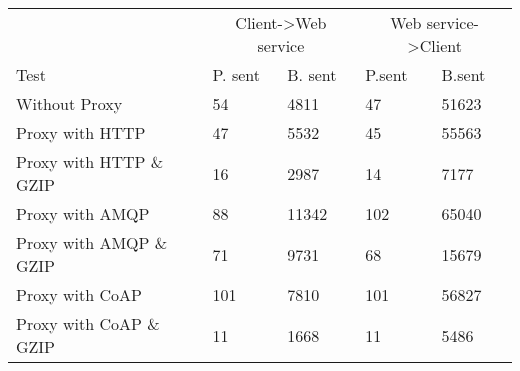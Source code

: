 \begin{tabularx}{\textwidth}{lXXXX}
\hline
\multicolumn{1}{l}{}                  & \multicolumn{2}{c}{Client->Web service}                           & \multicolumn{2}{c}{Web service->Client}                           \\
\multicolumn{1}{l}{Test} & \multicolumn{1}{l}{P. sent} & \multicolumn{1}{l}{B. sent} & \multicolumn{1}{l}{P.sent} & \multicolumn{1}{l}{B.sent} \\ \hline
Without Proxy                   & 54             & 4811           & 47             & 51623          \\
Proxy with HTTP                 & 47             & 5532           & 45             & 55563          \\
Proxy with HTTP \& GZIP         & 16             & 2987           & 14             & 7177           \\
Proxy with AMQP                 & 88             & 11342          & 102            & 65040          \\
Proxy with AMQP \& GZIP         & 71             & 9731           & 68             & 15679          \\
Proxy with CoAP                 & 101            & 7810           & 101            & 56827          \\
Proxy with CoAP \& GZIP         & 11             & 1668           & 11             & 5486           \\
\end{tabularx}
